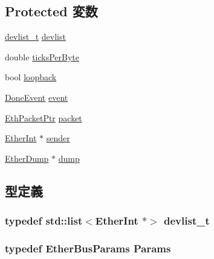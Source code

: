\subsection*{Protected 変数}
\begin{DoxyCompactItemize}
\item 
\hyperlink{classstd_1_1list}{devlist\_\-t} \hyperlink{classEtherBus_a2fac447706dd3bd8d783a380065b144b}{devlist}
\item 
double \hyperlink{classEtherBus_ab03ddf4a7f12da61f07e2e0c644ef06c}{ticksPerByte}
\item 
bool \hyperlink{classEtherBus_a3ea0b2f2695b0c84cd8495484456a58e}{loopback}
\item 
\hyperlink{classEtherBus_1_1DoneEvent}{DoneEvent} \hyperlink{classEtherBus_aa53a666ea226afe0aba62ffc48fda9a8}{event}
\item 
\hyperlink{classRefCountingPtr}{EthPacketPtr} \hyperlink{classEtherBus_a8bd0d3f7eb9e8d7189c7027028a5fac0}{packet}
\item 
\hyperlink{classEtherInt}{EtherInt} $\ast$ \hyperlink{classEtherBus_a748042e0d79456e5d2ec45a85392b06c}{sender}
\item 
\hyperlink{classEtherDump}{EtherDump} $\ast$ \hyperlink{classEtherBus_ad5a0f1baca11c9598fdb6996bd03ac8c}{dump}
\end{DoxyCompactItemize}


\subsection{型定義}
\hypertarget{classEtherBus_aa7b4b8d9a39bc67842b5c47e1b2a1b19}{
\subsubsection[{devlist\_\-t}]{\setlength{\rightskip}{0pt plus 5cm}typedef {\bf std::list}$<${\bf EtherInt} $\ast$$>$ {\bf devlist\_\-t}}}
\label{classEtherBus_aa7b4b8d9a39bc67842b5c47e1b2a1b19}
\hypertarget{classEtherBus_af0984f6bd7717c1679765dfdacae4ddd}{
\subsubsection[{Params}]{\setlength{\rightskip}{0pt plus 5cm}typedef EtherBusParams {\bf Params}}}
\label{classEtherBus_af0984f6bd7717c1679765dfdacae4ddd}


